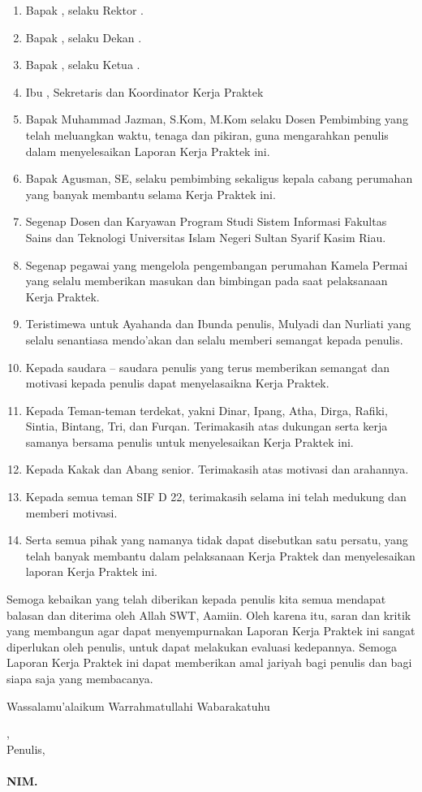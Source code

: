 \begin{enumerate}
	\item Bapak \rektor, selaku Rektor \universitas.
	\item Bapak \dekan, selaku Dekan \fakultas.
	\item Bapak \kaprodi, selaku Ketua \programStudi \space
	      \fakultas \space \universitas.
	\item Ibu \sekretarisprodi, Sekretaris dan Koordinator Kerja Praktek \programStudi \space
	      \fakultas \space \universitas
       \item Bapak Muhammad Jazman, S.Kom, M.Kom selaku  Dosen Pembimbing yang telah meluangkan waktu, tenaga dan pikiran, guna mengarahkan penulis dalam menyelesaikan Laporan Kerja Praktek ini.
	\item Bapak Agusman, SE, selaku pembimbing sekaligus kepala cabang perumahan yang banyak membantu selama Kerja Praktek ini.
 \item Segenap Dosen dan Karyawan Program Studi Sistem Informasi Fakultas Sains dan Teknologi Universitas Islam Negeri Sultan Syarif Kasim Riau.
 \item Segenap pegawai yang mengelola pengembangan perumahan Kamela Permai yang selalu memberikan masukan dan bimbingan pada saat pelaksanaan Kerja Praktek.
 \item Teristimewa untuk Ayahanda dan Ibunda penulis, Mulyadi dan Nurliati yang selalu senantiasa mendo’akan dan selalu memberi semangat kepada penulis.
 \item Kepada saudara – saudara penulis yang terus memberikan semangat dan motivasi kepada penulis dapat menyelasaikna Kerja Praktek.
 \item Kepada Teman-teman terdekat, yakni Dinar, Ipang, Atha, Dirga, Rafiki, Sintia, Bintang, Tri, dan Furqan. Terimakasih atas dukungan serta kerja samanya bersama penulis untuk menyelesaikan Kerja Praktek ini.
 \item  Kepada Kakak dan Abang senior. Terimakasih atas motivasi dan arahannya.
 \item Kepada semua teman SIF D 22, terimakasih selama ini telah medukung dan memberi motivasi.
 \item Serta semua pihak yang namanya tidak dapat disebutkan satu persatu, yang telah banyak membantu dalam pelaksanaan Kerja Praktek dan menyelesaikan laporan Kerja Praktek ini.

\end{enumerate}

Semoga kebaikan yang telah diberikan kepada penulis kita semua mendapat balasan dan diterima oleh Allah SWT, Aamiin. Oleh karena itu, saran dan kritik yang membangun agar dapat menyempurnakan Laporan Kerja Praktek ini sangat diperlukan oleh penulis, untuk dapat melakukan evaluasi kedepannya. Semoga Laporan Kerja Praktek ini dapat memberikan amal jariyah bagi penulis dan bagi siapa saja yang membacanya.

\par Wassalamu'alaikum Warrahmatullahi Wabarakatuhu

\vspace*{0.1cm}

\begin{flushright}
	\kota, \tanggalPersetujuan\\
	Penulis,\\
	\vspace{2cm}
	\textbf{\underline{\penulis}\\
		NIM. \nim}

\end{flushright}

